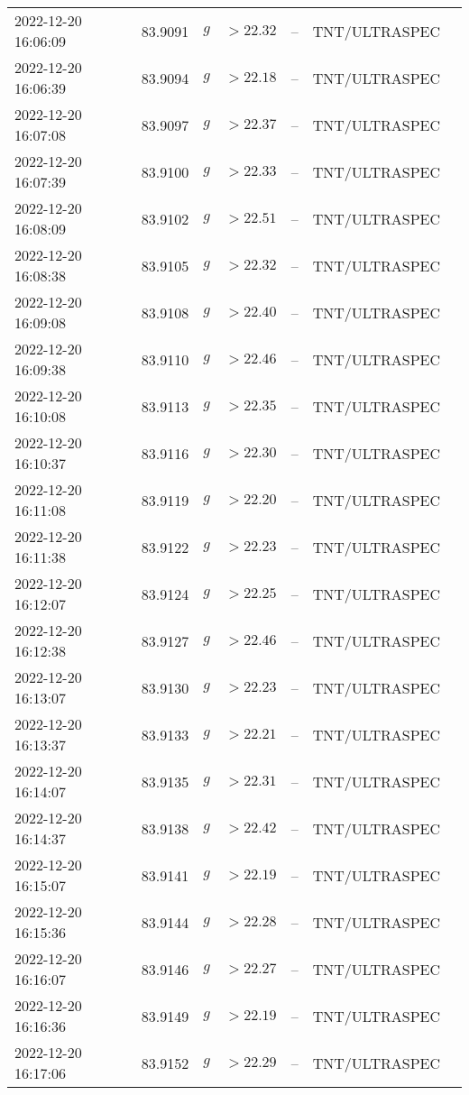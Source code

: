 \documentclass{nature_plusfigure}
\begin{document}
\begin{supplement}
\begin{center}
\begin{longtable}{lllllll}
2022-12-20 16:06:09 & 83.9091 & $g$ & $>22.32$ & -- & TNT/ULTRASPEC &  \\ 
2022-12-20 16:06:39 & 83.9094 & $g$ & $>22.18$ & -- & TNT/ULTRASPEC &  \\ 
2022-12-20 16:07:08 & 83.9097 & $g$ & $>22.37$ & -- & TNT/ULTRASPEC &  \\ 
2022-12-20 16:07:39 & 83.9100 & $g$ & $>22.33$ & -- & TNT/ULTRASPEC &  \\ 
2022-12-20 16:08:09 & 83.9102 & $g$ & $>22.51$ & -- & TNT/ULTRASPEC &  \\ 
2022-12-20 16:08:38 & 83.9105 & $g$ & $>22.32$ & -- & TNT/ULTRASPEC &  \\ 
2022-12-20 16:09:08 & 83.9108 & $g$ & $>22.40$ & -- & TNT/ULTRASPEC &  \\ 
2022-12-20 16:09:38 & 83.9110 & $g$ & $>22.46$ & -- & TNT/ULTRASPEC &  \\ 
2022-12-20 16:10:08 & 83.9113 & $g$ & $>22.35$ & -- & TNT/ULTRASPEC &  \\ 
2022-12-20 16:10:37 & 83.9116 & $g$ & $>22.30$ & -- & TNT/ULTRASPEC &  \\ 
2022-12-20 16:11:08 & 83.9119 & $g$ & $>22.20$ & -- & TNT/ULTRASPEC &  \\ 
2022-12-20 16:11:38 & 83.9122 & $g$ & $>22.23$ & -- & TNT/ULTRASPEC &  \\ 
2022-12-20 16:12:07 & 83.9124 & $g$ & $>22.25$ & -- & TNT/ULTRASPEC &  \\ 
2022-12-20 16:12:38 & 83.9127 & $g$ & $>22.46$ & -- & TNT/ULTRASPEC &  \\ 
2022-12-20 16:13:07 & 83.9130 & $g$ & $>22.23$ & -- & TNT/ULTRASPEC &  \\ 
2022-12-20 16:13:37 & 83.9133 & $g$ & $>22.21$ & -- & TNT/ULTRASPEC &  \\ 
2022-12-20 16:14:07 & 83.9135 & $g$ & $>22.31$ & -- & TNT/ULTRASPEC &  \\ 
2022-12-20 16:14:37 & 83.9138 & $g$ & $>22.42$ & -- & TNT/ULTRASPEC &  \\ 
2022-12-20 16:15:07 & 83.9141 & $g$ & $>22.19$ & -- & TNT/ULTRASPEC &  \\ 
2022-12-20 16:15:36 & 83.9144 & $g$ & $>22.28$ & -- & TNT/ULTRASPEC &  \\ 
2022-12-20 16:16:07 & 83.9146 & $g$ & $>22.27$ & -- & TNT/ULTRASPEC &  \\ 
2022-12-20 16:16:36 & 83.9149 & $g$ & $>22.19$ & -- & TNT/ULTRASPEC &  \\ 
2022-12-20 16:17:06 & 83.9152 & $g$ & $>22.29$ & -- & TNT/ULTRASPEC &  \\ 

\end{longtable}
\end{center}
\end{supplement}
\end{document}
